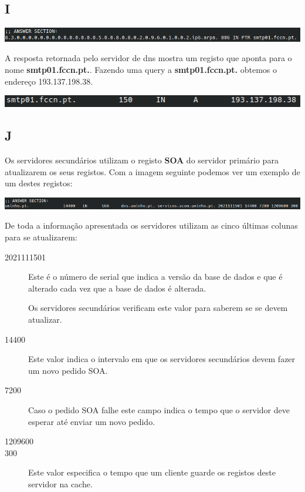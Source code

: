 \documentclass[size=11pt]{report}
\begin{document}
        \subsection*{I}
            \noindent
            \includegraphics[width=\textwidth]{images/dig_ipv6.png}
            \par
            A resposta retornada pelo servidor de dns mostra um registo que aponta para o nome \textbf{smtp01.fccn.pt.}.
            Fazendo uma query a \textbf{smtp01.fccn.pt.} obtemos o endereço 193.137.198.38.
            \par
            \noindent
            \includegraphics[width=\textwidth]{images/dig_smtp01.png}
            \par
        \subsection*{J}
            Os servidores secundários utilizam o registo \textbf{SOA} do servidor primário para atualizarem os seus registos. 
            Com a imagem seguinte podemos ver um exemplo de um destes registos: 
            \vspace{0.45em}
            \par
            \noindent
            \includegraphics[width=\textwidth]{images/uminho_soa.png}
            \par
            \vspace{0.45em}
            De toda a informação apresentada os servidores utilizam as cinco últimas colunas para se atualizarem:
            \begin{description}
                \item[2021111501] Este é o número de serial que indica a versão da base de dados e que é alterado cada vez que a base de dados é alterada. 
                \par Os servidores secundários verificam este valor para saberem se se devem atualizar.
                \item[14400] Este valor indica o intervalo em que os servidores secundários devem fazer um novo pedido SOA.
                \item[7200] Caso o pedido SOA falhe este campo indica o tempo que o servidor deve esperar até enviar um novo pedido.
                \item[1209600] 
                \item[300] Este valor especifica o tempo que um cliente guarde os registos deste servidor na cache. 
            \end{description}
\end{document}
